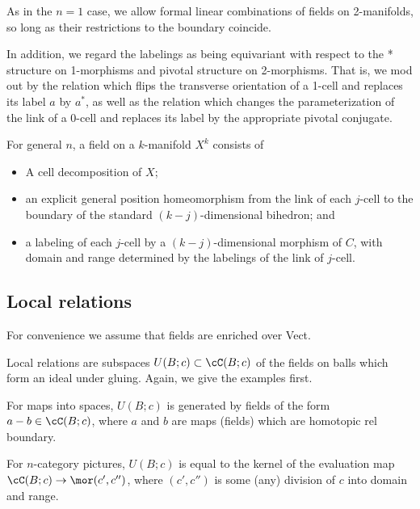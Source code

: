As in the $n=1$ case, we allow formal linear combinations of fields on 2-manifolds, 
so long as their restrictions to the boundary coincide.

In addition, we regard the labelings as being equivariant with respect to the * structure
on 1-morphisms and pivotal structure on 2-morphisms.
That is, we mod out by the relation which flips the transverse orientation of a 1-cell 
and replaces its label $a$ by $a^*$, as well as the relation which changes the parameterization of the link
of a 0-cell and replaces its label by the appropriate pivotal conjugate.

\medskip

For general $n$, a field on a $k$-manifold $X^k$ consists of
\begin{itemize}
    \item A cell decomposition of $X$;
    \item an explicit general position homeomorphism from the link of each $j$-cell
to the boundary of the standard $(k-j)$-dimensional bihedron; and
    \item a labeling of each $j$-cell by a $(k-j)$-dimensional morphism of $C$, with
domain and range determined by the labelings of the link of $j$-cell.
\end{itemize}



\subsection{Local relations}
\label{sec:local-relations}

For convenience we assume that fields are enriched over Vect.

Local relations are subspaces $U(B; c)\sub \cC(B; c)$ of the fields on balls which form an ideal under gluing.
Again, we give the examples first.

\addtocounter{prop}{-2}
\begin{example}[contd.]
For maps into spaces, $U(B; c)$ is generated by fields of the form $a-b \in \lf(B; c)$,
where $a$ and $b$ are maps (fields) which are homotopic rel boundary.
\end{example}

\begin{example}[contd.]
For $n$-category pictures, $U(B; c)$ is equal to the kernel of the evaluation map
$\lf(B; c) \to \mor(c', c'')$, where $(c', c'')$ is some (any) division of $c$ into
domain and range.
\end{example}

